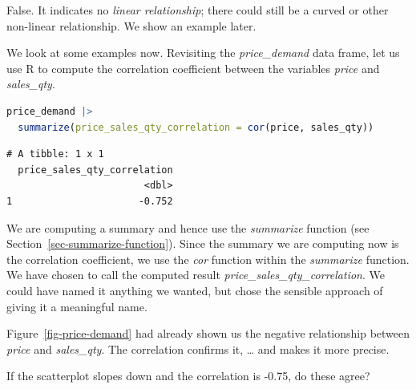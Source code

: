 \documentclass[
  12pt,
  letterpaper,
  DIV=11,
  numbers=noendperiod]{scrreprt}
\begin{document}
\begin{tcolorbox}[enhanced jigsaw, colback=white, leftrule=.75mm, toprule=.15mm, bottomtitle=1mm, breakable, coltitle=black, toptitle=1mm, title={Suggested answer}, opacitybacktitle=0.6, colbacktitle=quarto-callout-note-color!10!white, arc=.35mm, left=2mm, colframe=quarto-callout-note-color-frame, titlerule=0mm, rightrule=.15mm, bottomrule=.15mm, opacityback=0]

False. It indicates no \emph{linear relationship}; there could still be
a curved or other non-linear relationship. We show an example later.

\end{tcolorbox}

We look at some examples now. Revisiting the \emph{price\_demand} data
frame, let us use R to compute the correlation coefficient between the
variables \emph{price} and \emph{sales\_qty}.

\begin{lstlisting}[language=R]
price_demand |> 
  summarize(price_sales_qty_correlation = cor(price, sales_qty))
\end{lstlisting}

\begin{lstlisting}
# A tibble: 1 x 1
  price_sales_qty_correlation
                        <dbl>
1                      -0.752
\end{lstlisting}

We are computing a summary and hence use the \emph{summarize} function
(see Section~\ref{sec-summarize-function}). Since the summary we are
computing now is the correlation coefficient, we use the \emph{cor}
function within the \emph{summarize} function. We have chosen to call
the computed result \emph{price\_sales\_qty\_correlation}. We could have
named it anything we wanted, but chose the sensible approach of giving
it a meaningful name.

Figure~\ref{fig-price-demand} had already shown us the negative
relationship between \emph{price} and \emph{sales\_qty}. The correlation
confirms it, \ldots{} and makes it more precise.

\begin{tcolorbox}[enhanced jigsaw, colback=white, leftrule=.75mm, toprule=.15mm, bottomtitle=1mm, breakable, coltitle=black, toptitle=1mm, title={Quick Check}, opacitybacktitle=0.6, colbacktitle=quarto-callout-note-color!10!white, arc=.35mm, left=2mm, colframe=quarto-callout-note-color-frame, titlerule=0mm, rightrule=.15mm, bottomrule=.15mm, opacityback=0]

If the scatterplot slopes down and the correlation is -0.75, do these
agree?

\end{tcolorbox}
\end{document}
